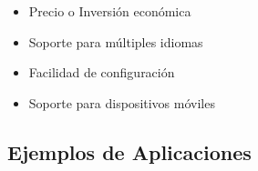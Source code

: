 \begin{itemize}
    \item Precio o Inversi\'on econ\'omica
    \item Soporte para m\'ultiples idiomas
    \item Facilidad de configuraci\'on
    \item Soporte para dispositivos m\'oviles
\end{itemize}

\subsection{Ejemplos de Aplicaciones}




